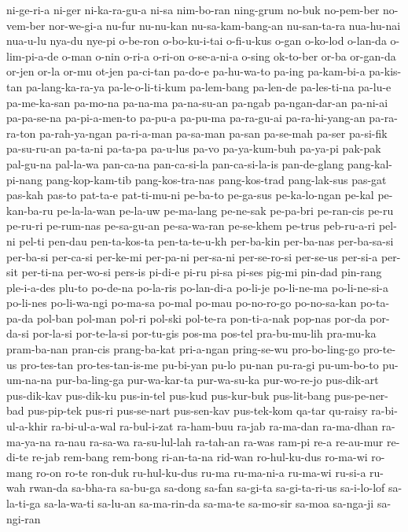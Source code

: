 {ni-ge-ri-a ni-ger ni-ka-ra-gu-a ni-sa nim-bo-ran ning-grum no-buk
no-pem-ber no-vem-ber nor-we-gi-a nu-fur nu-nu-kan nu-sa-kam-bang-an
nu-san-ta-ra nua-hu-nai nua-u-lu nya-du nye-pi o-be-ron o-bo-ku-i-tai
o-fi-u-kus o-gan o-ko-lod o-lan-da o-lim-pi-a-de o-man o-nin o-ri-a
o-ri-on o-se-a-ni-a o-sing ok-to-ber or-ba or-gan-da or-jen or-la or-mu
ot-jen pa-ci-tan pa-do-e pa-hu-wa-to pa-ing pa-kam-bi-a pa-kis-tan
pa-lang-ka-ra-ya pa-le-o-li-ti-kum pa-lem-bang pa-len-de pa-les-ti-na
pa-lu-e pa-me-ka-san pa-mo-na pa-na-ma pa-na-su-an pa-ngab pa-ngan-dar-an
pa-ni-ai pa-pa-se-na pa-pi-a-men-to pa-pu-a pa-pu-ma pa-ra-gu-ai
pa-ra-hi-yang-an pa-ra-ra-ton pa-rah-ya-ngan pa-ri-a-man pa-sa-man pa-san
pa-se-mah pa-ser pa-si-fik pa-su-ru-an pa-ta-ni pa-ta-pa pa-u-lus pa-vo
pa-ya-kum-buh pa-ya-pi pak-pak pal-gu-na pal-la-wa pan-ca-na pan-ca-si-la
pan-ca-si-la-is pan-de-glang pang-kal-pi-nang pang-kop-kam-tib
pang-kos-tra-nas pang-kos-trad pang-lak-sus pas-gat pas-kah pas-to
pat-ta-e pat-ti-mu-ni pe-ba-to pe-ga-sus pe-ka-lo-ngan pe-kal pe-kan-ba-ru
pe-la-la-wan pe-la-uw pe-ma-lang pe-ne-sak pe-pa-bri pe-ran-cis pe-ru
pe-ru-ri pe-rum-nas pe-sa-gu-an pe-sa-wa-ran pe-se-khem pe-trus
peb-ru-a-ri pel-ni pel-ti pen-dau pen-ta-kos-ta pen-ta-te-u-kh per-ba-kin
per-ba-nas per-ba-sa-si per-ba-si per-ca-si per-ke-mi per-pa-ni per-sa-ni
per-se-ro-si per-se-us per-si-a per-sit per-ti-na per-wo-si pers-is
pi-di-e pi-ru pi-sa pi-ses pig-mi pin-dad pin-rang ple-i-a-des plu-to
po-de-na po-la-ris po-lan-di-a po-li-je po-li-ne-ma po-li-ne-si-a
po-li-nes po-li-wa-ngi po-ma-sa po-mal po-mau po-no-ro-go po-no-sa-kan
po-ta-pa-da pol-ban pol-man pol-ri pol-ski pol-te-ra pon-ti-a-nak pop-nas
por-da por-da-si por-la-si por-te-la-si por-tu-gis pos-ma pos-tel
pra-bu-mu-lih pra-mu-ka pram-ba-nan pran-cis prang-ba-kat pri-a-ngan
pring-se-wu pro-bo-ling-go pro-te-us pro-tes-tan pro-tes-tan-is-me
pu-bi-yan pu-lo pu-nan pu-ra-gi pu-um-bo-to pu-um-na-na pur-ba-ling-ga
pur-wa-kar-ta pur-wa-su-ka pur-wo-re-jo pus-dik-art pus-dik-kav pus-dik-ku
pus-in-tel pus-kud pus-kur-buk pus-lit-bang pus-pe-ner-bad pus-pip-tek
pus-ri pus-se-nart pus-sen-kav pus-tek-kom qa-tar qu-raisy ra-bi-ul-a-khir
ra-bi-ul-a-wal ra-bul-i-zat ra-ham-buu ra-jab ra-ma-dan ra-ma-dhan
ra-ma-ya-na ra-nau ra-sa-wa ra-su-lul-lah ra-tah-an ra-was ram-pi re-a
re-au-mur re-di-te re-jab rem-bang rem-bong ri-an-ta-na rid-wan
ro-hul-ku-dus ro-ma-wi ro-mang ro-on ro-te ron-duk ru-hul-ku-dus ru-ma
ru-ma-ni-a ru-ma-wi ru-si-a ru-wah rwan-da sa-bha-ra sa-bu-ga sa-dong
sa-fan sa-gi-ta sa-gi-ta-ri-us sa-i-lo-lof sa-la-ti-ga sa-la-wa-ti
sa-lu-an sa-ma-rin-da sa-ma-te sa-mo-sir sa-moa sa-nga-ji sa-ngi-ran
}

